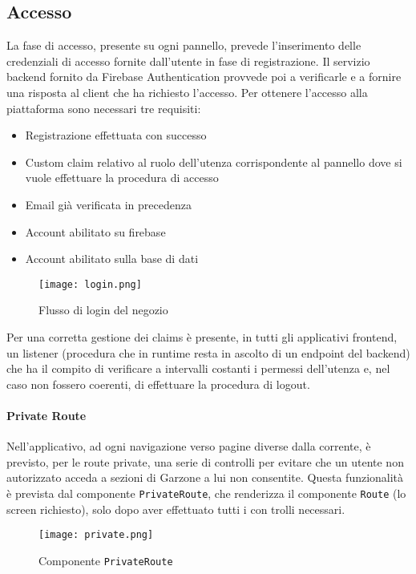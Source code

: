 \subsection{Accesso}
La fase di accesso, presente su ogni pannello, prevede l'inserimento delle credenziali di accesso fornite dall'utente in fase di registrazione. Il servizio backend fornito da Firebase Authentication provvede poi a verificarle e a fornire una risposta al client che ha richiesto l'accesso. Per ottenere l'accesso alla piattaforma sono necessari tre requisiti:
\begin{itemize}
    \item Registrazione effettuata con successo
    \item Custom claim relativo al ruolo dell'utenza corrispondente al pannello dove si vuole effettuare la procedura di accesso
    \item Email già verificata in precedenza
    \item Account abilitato su firebase
    \item Account abilitato sulla base di dati
\end{itemize}

\begin{figure}[h!]
    \centering
    \texttt{[image: login.png]}
    \caption{Flusso di login del negozio}
\end{figure}
\FloatBarrier
Per una corretta gestione dei claims è presente, in tutti gli applicativi frontend, un listener (procedura che in runtime resta in ascolto di un endpoint del backend) che ha il compito di verificare a intervalli costanti i permessi dell'utenza e, nel caso non fossero coerenti, di effettuare la procedura di logout.
\paragraph{Private Route} Nell'applicativo, ad ogni navigazione verso pagine diverse dalla corrente, è previsto, per le route private, una serie di controlli per evitare che un utente non autorizzato acceda a sezioni di Garzone a lui non consentite. Questa funzionalità è prevista dal componente \lstinline[basicstyle=\ttfamily]!PrivateRoute!, che renderizza il componente \lstinline[basicstyle=\ttfamily]!Route! (lo screen richiesto), solo dopo aver effettuato tutti i con trolli necessari.
\begin{figure}[h!]
    \centering
    \texttt{[image: private.png]}
    \caption{Componente \lstinline[basicstyle=\ttfamily]!PrivateRoute!}
\end{figure}
\FloatBarrier
